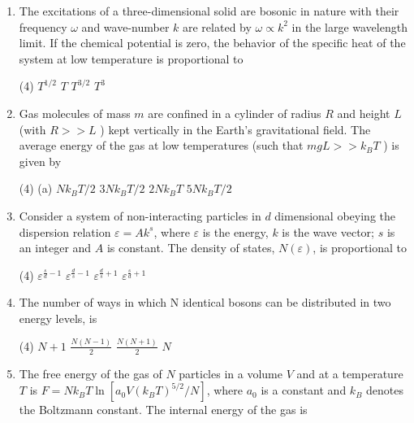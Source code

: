 \begin{enumerate}
\item The excitations of a three-dimensional solid are bosonic in nature with their frequency $\omega$ and wave-number $k$ are related by $\omega \propto k^{2}$ in the large wavelength limit. If the chemical potential is zero, the behavior of the specific heat of the system at low temperature is proportional to
{}
\begin{tasks}(4)
\task[\textbf{A.}] $T^{1 / 2}$
\task[\textbf{B.}] $T$
\task[\textbf{C.}]  $T^{3 / 2}$
\task[\textbf{D.}] $T^{3}$
\end{tasks}

\item Gas molecules of mass $m$ are confined in a cylinder of radius $R$ and height $L$ (with $R>>L$ ) kept vertically in the Earth's gravitational field. The average energy of the gas at low temperatures (such that $m g L>>k_{B} T$ ) is given by
{}

\begin{tasks}(4)
\task[\textbf{A.}] (a) $N k_{B} T / 2$
\task[\textbf{B.}] $3 N k_{B} T / 2$
\task[\textbf{C.}] $2 N k_{B} T$
\task[\textbf{D.}] $5 N k_{B} T / 2$
\end{tasks}

\item Consider a system of non-interacting particles in $d$ dimensional obeying the dispersion relation $\varepsilon=A k^{s}$, where $\varepsilon$ is the energy, $k$ is the wave vector; $s$ is an integer and $A$ is constant. The density of states, $N(\varepsilon)$, is proportional to
{}

\begin{tasks}(4)
\task[\textbf{A.}] $\varepsilon^{\frac{s}{d}-1}$
\task[\textbf{B.}] $\varepsilon^{\frac{d}{s}-1}$
\task[\textbf{C.}] $\varepsilon^{\frac{d}{s}+1}$
\task[\textbf{D.}] $\varepsilon^{\frac{s}{d}+1}$
\end{tasks}


\item The number of ways in which $\mathrm{N}$ identical bosons can be distributed in two energy levels, is
{}
\begin{tasks}(4)
\task[\textbf{A.}] $N+1$
\task[\textbf{B.}] $\frac{N(N-1)}{2}$
\task[\textbf{C.}] $\frac{N(N+1)}{2}$
\task[\textbf{D.}] $N$
\end{tasks}

\item The free energy of the gas of $N$ particles in a volume $V$ and at a temperature $T$ is $F=N k_{B} T \ln \left[a_{0} V\left(k_{B} T\right)^{5 / 2} / N\right]$, where $a_{0}$ is a constant and $k_{B}$ denotes the Boltzmann constant. The internal energy of the gas is
{}


\end{enumerate}
